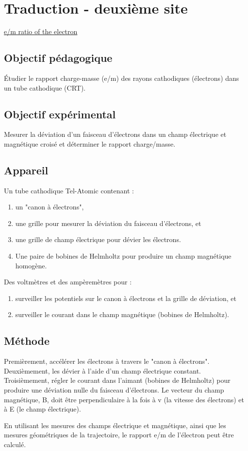 \documentclass[../main.tex]{subfiles}
\begin{document}
\section{Traduction - deuxième site }

\href{https://physicsx.erau.edu/HelmholtzCoils/Lab_MP_1.pdf}{e/m ratio of the electron}
    
\subsection{Objectif pédagogique}
Étudier le rapport charge-masse (e/m) des rayons cathodiques (électrons) dans un tube cathodique (CRT). 
\subsection{Objectif expérimental}
Mesurer la déviation d'un faisceau d'électrons dans un champ électrique et magnétique croisé et déterminer le rapport charge/masse.  
\subsection{Appareil}
Un tube cathodique Tel-Atomic contenant :
\begin{enumerate}
    \item un "canon à électrons", 
    \item une grille pour mesurer la déviation du faisceau d'électrons, et 
    \item une grille de champ électrique pour dévier les électrons. 
    \item Une paire de bobines de Helmholtz pour produire un champ magnétique homogène.   
\end{enumerate}
Des voltmètres et des ampèremètres pour : \\
\begin{enumerate}
    \item surveiller les potentiels sur le canon à électrons et la grille de déviation, et
    \item surveiller le courant dans le champ magnétique (bobines de Helmholtz).
\end{enumerate}
\subsection{Méthode}
Premièrement, accélérer les électrons à travers le "canon à électrons".  Deuxièmement, les dévier à l'aide d'un champ électrique constant.  Troisièmement, régler le courant dans l'aimant (bobines de Helmholtz) pour produire une déviation nulle du faisceau d'électrons.  Le vecteur du champ magnétique, B, doit être perpendiculaire à la fois à v (la vitesse des électrons) et à E (le champ électrique).\\
\par En utilisant les mesures des champs électrique et magnétique, ainsi que les mesures géométriques de la trajectoire, le rapport e/m de l'électron peut être calculé.
\end{document}
